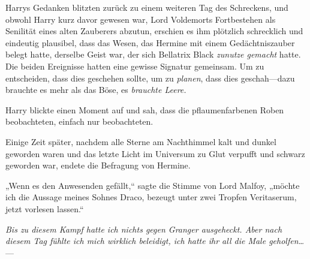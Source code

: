 Harrys Gedanken blitzten zurück zu einem weiteren Tag des Schreckens, und obwohl Harry kurz davor gewesen war, Lord Voldemorts Fortbestehen als Senilität eines alten Zauberers abzutun, erschien es ihm plötzlich schrecklich und eindeutig plausibel, dass das Wesen, das Hermine mit einem Gedächtniszauber belegt hatte, derselbe Geist war, der sich Bellatrix Black \emph{zunutze gemacht} hatte. Die beiden Ereignisse hatten eine gewisse Signatur gemeinsam. Um zu entscheiden, dass dies geschehen sollte, um zu \emph{planen}, dass dies geschah—dazu brauchte es mehr als das Böse, es \emph{brauchte Leere.}

Harry blickte einen Moment auf und sah, dass die pflaumenfarbenen Roben beobachteten, einfach nur beobachteten.

Einige Zeit später, nachdem alle Sterne am Nachthimmel kalt und dunkel geworden waren und das letzte Licht im Universum zu Glut verpufft und schwarz geworden war, endete die Befragung von Hermine.

„Wenn es den Anwesenden gefällt,“ sagte die Stimme von Lord Malfoy, „möchte ich die Aussage meines Sohnes Draco, bezeugt unter zwei Tropfen Veritaserum, jetzt vorlesen lassen.“

\emph{Bis zu diesem Kampf hatte ich nichts gegen Granger ausgeheckt. Aber nach diesem Tag fühlte ich mich wirklich beleidigt, ich hatte ihr all die Male geholfen…}—

